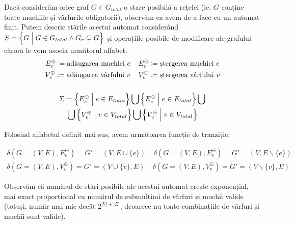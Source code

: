 Dacă considerăm orice graf $G \in G_{total}$ o stare posibilă a rețelei (ie. $G$ conține toate muchiile și vârfurile obligatorii), observăm ca avem de a face cu un automat finit. Putem descrie stările acestui automat considerând $S = \Big{\{} G  \; \Big{|} \; G \in G_{total} \land G_{r} \subseteq G \Big{\}}$ și operațiile posibile de modificare ale grafului cărora le vom asocia următorul alfabet:
\begin{gather*}
    E^\oplus_e \coloneqq \text{adăugarea muchiei } e \;\;\;\; E^\ominus_e \coloneqq \text{ștergerea muchiei } e \\
    V^\oplus_v \coloneqq \text{adăugarea vârfului } v \;\;\;\; V^\ominus_v \coloneqq \text{ștergerea vârfului } v \\
    \\
    \Sigma = \Big{\{} E^\oplus_e \; \Big{|} \; e \in E_{total} \Big{\}} \bigcup
    \Big{\{} E^\ominus_e \; \Big{|} \; e \in E_{total}  \Big{\}} \bigcup \\
    \bigcup \Big{\{} V^\oplus_v \; \Big{|} \; v \in V_{total} \Big{\}} \bigcup
    \Big{\{} V^\ominus_v \; \Big{|} \; v \in V_{total} \Big{\}}
\end{gather*}

Folosind alfabetul definit mai sus, avem următoarea funcție de tranziție:

\begin{gather*}
    \delta(G = (V, E), E^\oplus_e) = G' = (V, E \cup \{e\}) \;\;\;\; \delta(G = (V, E), E^\ominus_e) = G' = (V, E \backslash \{e\}) \\
    \delta(G = (V, E), V^\oplus_v) = G' = (V \cup \{v\}, E) \;\;\;\; \delta(G = (V, E), V^\ominus_v) = G' = (V \backslash \{v\}, E)
\end{gather*}

Observăm că numărul de stări posibile ale acestui automat crește exponențial, mai exact proporțional cu numărul de submulțimi de vârfuri și muchii valide (totuși, număr mai mic decât $2^{|V| + |E|}$, deoarece nu toate combinațiile de vârfuri și muchii sunt valide).

